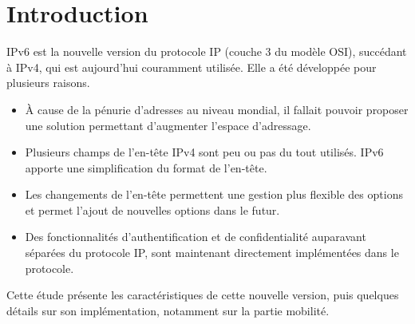 \section{Introduction}

IPv6 est la nouvelle version du protocole IP (couche 3 du modèle OSI), succédant à IPv4, qui est aujourd'hui couramment utilisée.
Elle a été développée pour plusieurs raisons.
\begin{itemize}
  \item À cause de la pénurie d’adresses au niveau mondial, il fallait pouvoir proposer une solution permettant d'augmenter l'espace d'adressage.
  \item Plusieurs champs de l'en-tête IPv4 sont peu ou pas du tout utilisés. IPv6 apporte une simplification du format de l'en-tête.
  \item Les changements de l'en-tête permettent une gestion plus flexible des options et permet l'ajout de nouvelles options dans le futur.
  \item Des fonctionnalités d'authentification et de confidentialité auparavant séparées du protocole IP, sont maintenant directement implémentées dans le protocole.
\end{itemize}
  
Cette étude présente les caractéristiques de cette nouvelle version, puis quelques détails sur son implémentation, notamment sur la partie mobilité.
  
